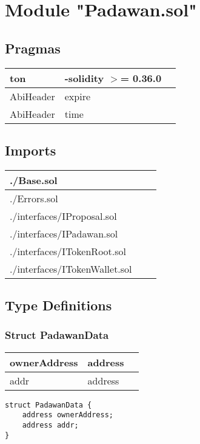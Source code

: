 
\section{Module "Padawan.sol"}


\subsection{Pragmas}


\noindent\begin{tabular}{|l|l|p{5cm}|}\hline
ton & -solidity $>$= 0.36.0 &\\\hline
AbiHeader &  expire &\\\hline
AbiHeader &  time &\\\hline
\end{tabular}


\subsection{Imports}


\noindent\begin{tabular}{|l|l|p{5cm}|}\hline
./Base.sol &\\\hline
./Errors.sol &\\\hline
./interfaces/IProposal.sol &\\\hline
./interfaces/IPadawan.sol &\\\hline
./interfaces/ITokenRoot.sol &\\\hline
./interfaces/ITokenWallet.sol &\\\hline
\end{tabular}


\subsection{Type Definitions}


\subsubsection{Struct PadawanData}


\ifsoltables
\noindent\begin{tabular}{|l|l|p{6cm}|}\hline
ownerAddress & address & \\\hline
addr & address & \\\hline
\end{tabular}
\fi


\begin{lstlisting}[firstnumber=12]
struct PadawanData {
    address ownerAddress;
    address addr;
}
\end{lstlisting}

